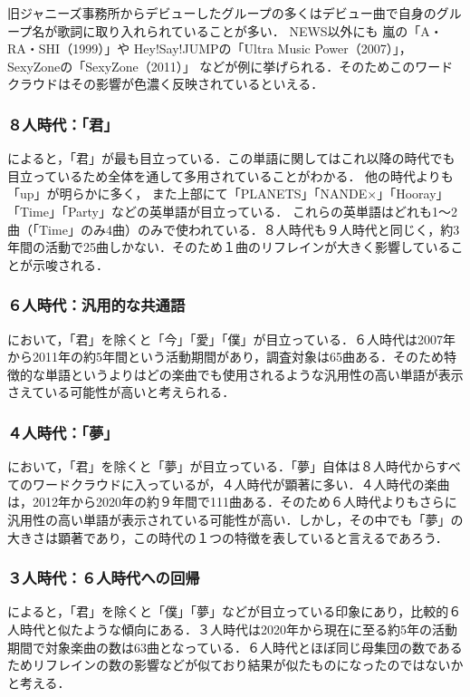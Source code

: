 旧ジャニーズ事務所からデビューしたグループの多くはデビュー曲で自身のグループ名が歌詞に取り入れられていることが多い．
NEWS以外にも
嵐の「A・RA・SHI（1999）\cite{ARASHI}」や
Hey!Say!JUMPの「Ultra Music Power（2007）\cite{JUMP}」，
SexyZoneの「SexyZone（2011）\cite{SZ}」
などが例に挙げられる．そのためこのワードクラウドはその影響が色濃く反映されているといえる．

\subsubsection{８人時代：「君」}
によると，「君」が最も目立っている．この単語に関してはこれ以降の時代でも目立っているため全体を通して多用されていることがわかる．
他の時代よりも「up」が明らかに多く，
また上部にて「PLANETS」「NANDE×」「Hooray」「Time」「Party」などの英単語が目立っている．
これらの英単語はどれも1～2曲（「Time」のみ4曲）のみで使われている．８人時代も９人時代と同じく，約3年間の活動で25曲しかない．そのため１曲のリフレインが大きく影響していることが示唆される．

\subsubsection{６人時代：汎用的な共通語}
において，「君」を除くと「今」「愛」「僕」が目立っている．６人時代は2007年から2011年の約5年間という活動期間があり，調査対象は65曲ある．そのため特徴的な単語というよりはどの楽曲でも使用されるような汎用性の高い単語が表示さえている可能性が高いと考えられる．


\subsubsection{４人時代：「夢」}
において，「君」を除くと「夢」が目立っている．「夢」自体は８人時代からすべてのワードクラウドに入っているが，４人時代が顕著に多い．４人時代の楽曲は，2012年から2020年の約９年間で111曲ある．そのため６人時代よりもさらに汎用性の高い単語が表示されている可能性が高い．しかし，その中でも「夢」の大きさは顕著であり，この時代の１つの特徴を表していると言えるであろう．

\subsubsection{３人時代：６人時代への回帰}
によると，「君」を除くと「僕」「夢」などが目立っている印象にあり，比較的６人時代と似たような傾向にある．３人時代は2020年から現在に至る約5年の活動期間で対象楽曲の数は63曲となっている．６人時代とほぼ同じ母集団の数であるためリフレインの数の影響などが似ており結果が似たものになったのではないかと考える．

